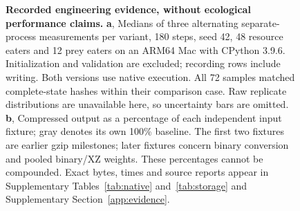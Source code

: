 \begin{figure}[p]
\vspace{7mm}
\caption{\textbf{Recorded engineering evidence, without ecological performance claims.}
\textbf{a}, Medians of three alternating separate-process measurements per
variant, 180 steps, seed 42, 48 resource eaters and 12 prey eaters on an ARM64
Mac with CPython 3.9.6. Initialization and validation are excluded; recording
rows include writing. Both versions use native execution. All 72 samples matched
complete-state hashes within their comparison case. Raw replicate distributions
are unavailable here, so uncertainty bars are omitted.
\textbf{b}, Compressed output as a percentage of each independent input fixture;
gray denotes its own 100\% baseline. The first two fixtures are earlier gzip
milestones; later fixtures concern binary conversion and pooled binary/XZ
weights. These percentages cannot be compounded. Exact bytes, times and source
reports appear in Supplementary Tables~\ref{tab:native} and~\ref{tab:storage} and
Supplementary Section~\ref{app:evidence}.}
\label{fig:engineering}
\end{figure}
